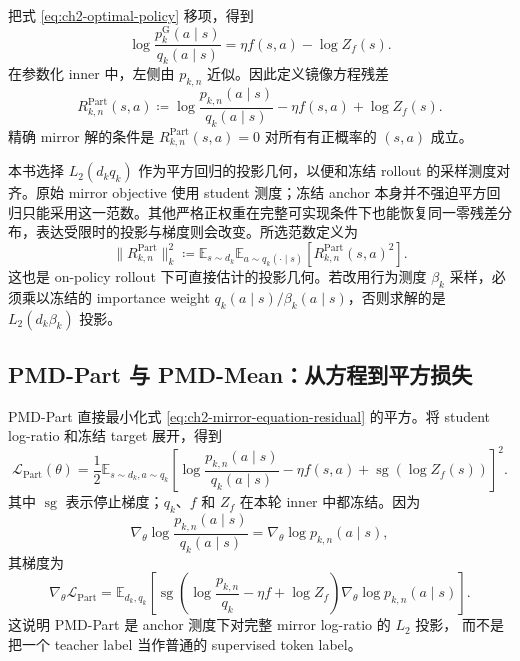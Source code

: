 \documentclass[lang=cn,scheme=chinese,openany]{../book/elegantbook}
\begin{document}
把式 \eqref{eq:ch2-optimal-policy} 移项，得到
\begin{equation}
\label{eq:ch2-logratio-equation}
\log\frac{ p_k^{\mathrm G}(a\mid s)}{ q_k(a\mid s)}
=\eta f(s,a)-\log Z_f(s).
\end{equation}
在参数化 inner 中，左侧由 $ p_{k,n}$ 近似。因此定义镜像方程残差
\begin{equation}
R_{k,n}^{\mathrm{Part}}(s,a)
\coloneqq
\log\frac{ p_{k,n}(a\mid s)}{ q_k(a\mid s)}
-\eta f(s,a)+\log Z_f(s).
\label{eq:ch2-mirror-equation-residual}
\end{equation}
精确 mirror 解的条件是 $R_{k,n}^{\mathrm{Part}}(s,a)=0$ 对所有有正概率的
$(s,a)$ 成立。

本书选择 $L_2(d_kq_k)$ 作为平方回归的投影几何，以便和冻结 rollout 的采样测度对齐。原始 mirror objective 使用 student 测度；冻结 anchor 本身并不强迫平方回归只能采用这一范数。其他严格正权重在完整可实现条件下也能恢复同一零残差分布，表达受限时的投影与梯度则会改变。所选范数定义为
\begin{equation}
\lVert R_{k,n}^{\mathrm{Part}}\rVert_k^2
\coloneqq
\mathbb E_{s\sim d_k}\mathbb E_{a\sim q_k(\cdot\mid s)}
\left[R_{k,n}^{\mathrm{Part}}(s,a)^2\right].
\label{eq:ch2-anchor-projection-norm}
\end{equation}
这也是 on-policy rollout 下可直接估计的投影几何。若改用行为测度 $\beta_k$
采样，必须乘以冻结的 importance weight
$ q_k(a\mid s)/\beta_k(a\mid s)$，否则求解的是 $L_2(d_k\beta_k)$ 投影。

\subsection{PMD-Part 与 PMD-Mean：从方程到平方损失}
\label{subsec:ch2-pmd-loss-derivation}

PMD-Part 直接最小化式 \eqref{eq:ch2-mirror-equation-residual} 的平方。将
student log-ratio 和冻结 target 展开，得到
\begin{equation}
\label{eq:ch2-regression-from-mirror}
\mathcal L_{\mathrm{Part}}(\theta)
=\frac12\mathbb E_{s\sim d_k,a\sim q_k}
\left[
\log\frac{ p_{k,n}(a\mid s)}{ q_k(a\mid s)}
-\eta f(s,a)+\operatorname{sg}\!\left(\log Z_f(s)\right)
\right]^2.
\end{equation}
其中 $\operatorname{sg}$ 表示停止梯度；$ q_k$、$f$ 和 $Z_f$ 在本轮
inner 中都冻结。因为
\begin{equation*}
\nabla_\theta\log\frac{ p_{k,n}(a\mid s)}{ q_k(a\mid s)}
=\nabla_\theta\log p_{k,n}(a\mid s),
\end{equation*}
其梯度为
\begin{equation}
\nabla_\theta\mathcal L_{\mathrm{Part}}
=\mathbb E_{d_k, q_k}
\left[\operatorname{sg}\!\left(
\log\frac{ p_{k,n}}{ q_k}-\eta f+\log Z_f
\right)\nabla_\theta\log p_{k,n}(a\mid s)\right].
\label{eq:ch2-part-gradient-bridge}
\end{equation}
这说明 PMD-Part 是 anchor 测度下对完整 mirror log-ratio 的 $L_2$ 投影，
而不是把一个 teacher label 当作普通的 supervised token label。
\end{document}
